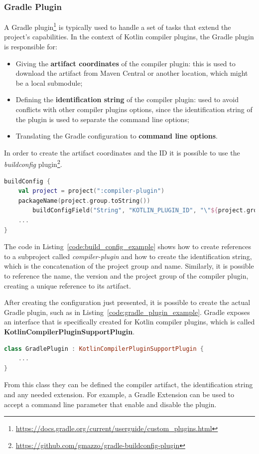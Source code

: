 \subsubsection{Gradle Plugin}\label{section:gradle_plugin}
A Gradle plugin\footnote{\url{https://docs.gradle.org/current/userguide/custom_plugins.html}} is typically used to handle a set of tasks that extend the project's capabilities.\newline
In the context of Kotlin compiler plugins, the Gradle plugin is responsible for:
\begin{itemize}
    \item Giving the \textbf{artifact coordinates} of the compiler plugin: this is used to download the artifact from Maven Central or another location, which might be a local submodule;
    \item Defining the \textbf{identification string} of the compiler plugin: used to avoid conflicts with other compiler plugins options, since the identification string of the plugin is used to separate the command line options;
    \item Translating the Gradle configuration to \textbf{command line options}.
\end{itemize}

In order to create the artifact coordinates and the ID it is possible to use the \textit{buildconfig} plugin\footnote{\url{https://github.com/gmazzo/gradle-buildconfig-plugin}}.
\begin{lstlisting}[caption={Example of a \textit{buildconfig} that creates the compiler plugin artifact}, language=Kotlin, captionpos=b, label={code:build_config_example}]
buildConfig {
    val project = project(":compiler-plugin")
    packageName(project.group.toString())
        buildConfigField("String", "KOTLIN_PLUGIN_ID", "\"${project.group}.${project.name}\"")
    ...
}
\end{lstlisting}
The code in Listing~\ref{code:build_config_example} shows how to create references to a subproject called \textit{compiler-plugin} and how to create the identification string, which is the concatenation of the project group and name. Similarly, it is possible to reference the name, the version and the project group of the compiler plugin, creating a unique reference to its artifact.

After creating the configuration just presented, it is possible to create the actual Gradle plugin, such as in Listing~\ref{code:gradle_plugin_example}. Gradle exposes an interface that is specifically created for Kotlin compiler plugins, which is called \textbf{KotlinCompilerPluginSupportPlugin}.
\begin{lstlisting}[caption={Gradle plugin class example}, language=Kotlin, captionpos=b, label={code:gradle_plugin_example}]
class GradlePlugin : KotlinCompilerPluginSupportPlugin {
    ...
}
\end{lstlisting}
From this class they can be defined the compiler artifact, the identification string and any needed extension. For example, a Gradle Extension can be used to accept a command line parameter that enable and disable the plugin.

